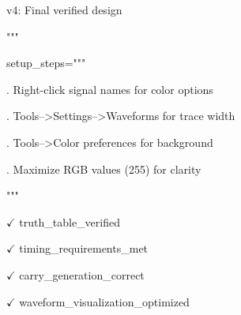 \documentclass[11pt]{article}
\begin{document}
\noindent v4: Final verified design

\noindent """

\vspace{0.5em}


\noindent setup\_steps="""

. Right-click signal names for color options

. Tools-->Settings-->Waveforms for trace width

. Tools-->Color preferences for background

. Maximize RGB values (255) for clarity

\noindent """

\vspace{0.5em}


\noindent $\checkmark$ truth\_table\_verified

\noindent $\checkmark$ timing\_requirements\_met

\noindent $\checkmark$ carry\_generation\_correct

\noindent $\checkmark$ waveform\_visualization\_optimized
\end{document}
